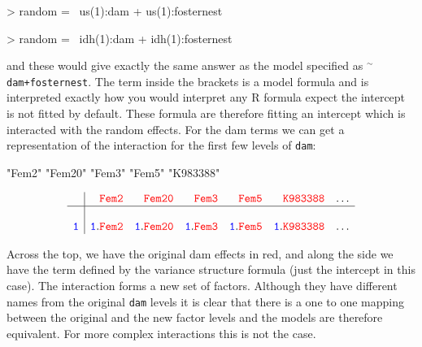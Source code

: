 \documentclass{article}
\begin{document}
\begin{Schunk}
\begin{Sinput}
> random = ~us(1):dam + us(1):fosternest
\end{Sinput}
\end{Schunk}

\begin{Schunk}
\begin{Sinput}
> random = ~idh(1):dam + idh(1):fosternest
\end{Sinput}
\end{Schunk}

and these would give exactly the same answer as the model specified as $^{\sim}$\texttt{dam+fosternest}. The term inside the brackets is a model formula and is interpreted exactly how you would interpret any R formula expect the intercept is not fitted by default. These formula are therefore fitting an intercept which is interacted with the random effects. For the dam terms we can get a representation of the interaction for the first few levels of \texttt{dam}:

\begin{Schunk}
\begin{Soutput}
[1] "Fem2"    "Fem20"   "Fem3"    "Fem5"    "K983388"
\end{Soutput}
\end{Schunk}


\begin{displaymath}
\begin{array}{c|rrrrrc}
&{\color{red} \texttt{Fem2}}&{\color{red} \texttt{Fem20}}&{\color{red} \texttt{Fem3}}&{\color{red} \texttt{Fem5}}&{\color{red} \texttt{K983388}}&\dots\\
\hline\\
{\color{blue} \texttt{1}}&{\color{blue} \texttt{1}}.{\color{red} \texttt{Fem2}}&{\color{blue} \texttt{1}}.{\color{red} \texttt{Fem20}}&{\color{blue} \texttt{1}}.{\color{red} \texttt{Fem3}}&{\color{blue} \texttt{1}}.{\color{red} \texttt{Fem5}}&{\color{blue} \texttt{1}}.{\color{red} \texttt{K983388}}&\dots\\
\end{array}
\end{displaymath}
  
Across the top, we have the original dam effects in red, and along the side we have the term defined by the variance structure formula (just the intercept in this case).  The interaction forms a new set of factors. Although they have different names from the original \texttt{dam} levels it is clear that there is a one to one mapping between the original and the new factor levels and the models are therefore equivalent.  For more complex interactions this is not the case.\\
\end{document}
